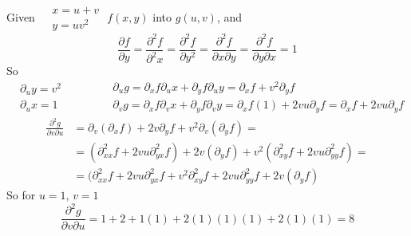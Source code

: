 \documentclass[twoside]{amsart}
\theoremstyle{plain}
\theoremstyle{definition}
\newcommand{\exercisehead}[1]
  {
   \noindent{\small\bf Exercise #1.}
   \smallskip}
\begin{document}
\exercisehead{6} Given $\begin{aligned}
  & x = u + v \\
  & y = uv^2 
\end{aligned}$ \quad $f(x,y)$ into $g(u,v)$, and 
\[
\frac{ \partial f}{ \partial y } = \frac{ \partial^2 f }{ \partial^2 x } = \frac{ \partial^2 f }{ \partial y^2 } = \frac{ \partial^2 f }{ \partial x \partial y } = \frac{ \partial^2 f }{ \partial y \partial x } = 1 
\]  
So 
\[
\begin{aligned}
  & \partial_u y = v^2 \\
  & \partial_u x = 1 
\end{aligned} \quad \quad \quad 
\begin{aligned}
  & \partial_u g = \partial_x f \partial_u x + \partial_y f \partial_u y = \partial_x f + v^2 \partial_y f \\
  & \partial_v g = \partial_x f \partial_v x + \partial_y f \partial_v y = \partial_x f(1) + 2vu \partial_y f = \partial_x f + 2vu \partial_y f 
\end{aligned}
\]
\[
\begin{aligned}
  \frac{ \partial^2 g}{ \partial v \partial u } & = \partial_v (\partial_x f ) + 2v \partial_y f + v^2 \partial_v (\partial_y f) = \\
  & = (\partial_{xx}^2 f + 2vu \partial_{yx}^2 f ) + 2v (\partial_y f) + v^2 (\partial_{xy}^2 f + 2vu \partial_{yy}^2 f ) = \\
  & = (\partial_{xx}^2 f + 2vu \partial_{yx}^2 f + v^2 \partial_{xy}^2 f + 2vu \partial_{yy}^2 f + 2v (\partial_y f) 
\end{aligned}
\]
So for $u=1$, $v=1$
\[
\frac{ \partial^2 g}{ \partial v \partial u } = 1 + 2 + 1(1) + 2(1)(1)(1) + 2 (1)(1) = \boxed{ 8 }
\]
\end{document}
